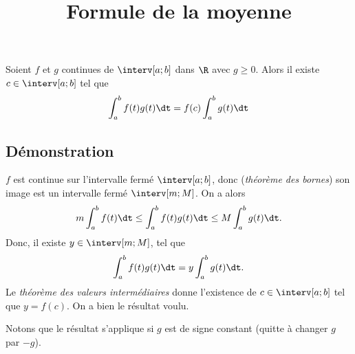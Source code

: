 \documentclass[fontsize=12pt,twoside=false,parskip=half]{scrartcl}
\title{Formule de la moyenne}
\date{}
\author{}
\begin{document}
\maketitle
   \begin{Theoreme}
      Soient $f$ et $g$ continues de $\interv[a; b]$ dans $\R$ avec $g \geq 0$. Alors il existe $c \in \interv[a; b]$
      tel que
      \[
         \int_a^b f(t)g(t) \dt = f(c) \int_a^b g(t) \dt
      \]
   \end{Theoreme}
   \subsection{Démonstration}
      $f$ est continue sur l’intervalle fermé $\interv[a; b]$, donc (\emph{théorème des bornes}) son image est un 
      intervalle fermé $\interv[m; M]$. On a alors
      \[
         m\int_a^b f(t)\dt \leq \int_a^b f(t)g(t) \dt \leq M\int_a^b g(t) \dt.
      \]
      Donc, il existe $y \in \interv[m; M]$, tel que
      \[
         \int_a^b f(t)g(t) \dt = y\int_a^b g(t) \dt.
      \]
      Le \emph{théorème des valeurs intermédiaires} donne l’existence de $c \in \interv[a; b]$ tel que $y = f(c)$.
      On a bien le résultat voulu.
      
      Notons que le résultat s’applique si $g$ est de signe constant (quitte à changer $g$ par $-g$).
\end{document}

